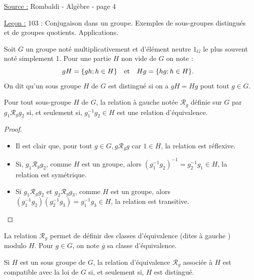 

\pagestyle{fancy}

\fancyhead[R]{}

\newcommand{\Rg}{\mathcal{R}_g}



\underline{Source :} Rombaldi - Algèbre - page 4 \newline

\underline{Leçon :} 103 : Conjugaison dans un groupe. Exemples de sous-groupes distingués et de groupes quotients. Applications. 

\begin{nota}
Soit $G$ un groupe noté multiplicativement et d'élément neutre $1_G$ le plus souvent noté simplement 1. 
Pour une partie $H$ non vide de $G$ on note :
\[ gH = \{ gh ; h \in H \} \quad \text{et} \quad Hg = \{ hg; h \in H \}. \]
On dit qu'un sous groupe $H$ de $G$ est distingué si on a $gH = Hg$ pout tout $g \in G$. 
\end{nota}

\begin{lem}
Pour tout sous-groupe $H$ de $G$, la relation \og à gauche \fg{} notée $\Rg$ définie sur $G$ par 
$g_1 \Rg g_2$ si, et seulement si, $g_1^{-1} g_2 \in H$ est une relation d'équivalence. 
\end{lem}

\begin{proof}
\begin{itemize}
\item 
Il est clair que, pour tout $g \in G, g \Rg g$ car $1 \in H$, la relation est réflexive.
\item
Si, $g_1 \Rg g_2$, comme $H$ est un groupe, alors $(g_1^{-1} g_2)^{-1} = g_2^{-1} g_1 \in H$, la relation est symétrique.
\item
Si $g_1 \Rg g_2$ et $g_2 \Rg g_3$, comme $H$ est un groupe, alors $(g_1^{-1} g_2) ( g_2^{-1} g_3) = g_1^{-1} g_3 \in H$, 
la relation est transitive.
\end{itemize}
\end{proof}

\begin{nota}
La relation $\Rg$ permet de définir des classes d'équivalence (dites \og à gauche \fg) modulo $H$. 
Pour $g \in G$, on note $\overline{g}$ sa classe d'équivalence.
\end{nota}

\begin{lem}
\label{lem:compat}
Si $H$ est un sous groupe de $G$, la relation d'équivalence $\Rg$ associée à $H$ est compatible avec la loi de $G$ 
si, et seulement si, $H$ est distingué.
\end{lem}

